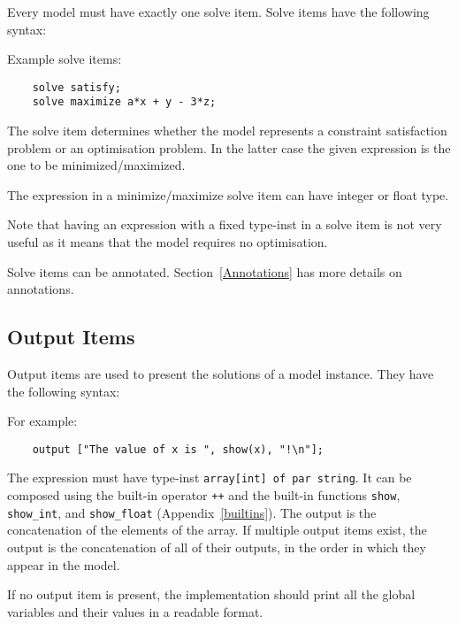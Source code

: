 \documentclass[10pt]{scrartcl}
\begin{document}
Every model must have exactly one solve item.  Solve items have the
following syntax:
\begin{productions}
    \RuleSolveItem
\end{productions}
Example solve items:
\begin{verbatim}
    solve satisfy;
    solve maximize a*x + y - 3*z;
\end{verbatim}

The solve item determines whether the model represents a constraint
satisfaction problem or an optimisation problem.  In the latter case the
given expression is the one to be minimized/maximized.

The expression in a minimize/maximize solve item can have integer or float type.

Note that having an expression with a fixed type-inst in a solve item is not
very useful as it means that the model requires no optimisation.

Solve items can be annotated.  Section~\ref{Annotations} has more details on
annotations.

\subsection{Output Items}
     \label{Output Items}
Output items are used to present the solutions of a model instance.
They have the following syntax:
\begin{productions}
    \RuleOutputItem
\end{productions}
For example:
\begin{verbatim}
    output ["The value of x is ", show(x), "!\n"];
\end{verbatim}

The expression must have type-inst \texttt{array[int] of par string}.  It
can be composed using the built-in operator \texttt{++}
and the built-in functions \texttt{show}, \texttt{show\_int}, and
\texttt{show\_float} 
(Appendix~\ref{builtins}).
The output is the concatenation of the elements of the array. If multiple output items exist, the output is the concatenation of all of their outputs,
in the order in which they appear in the model.

If no output item is present,
the implementation should print all the global variables and their values
in a readable format.
\end{document}
